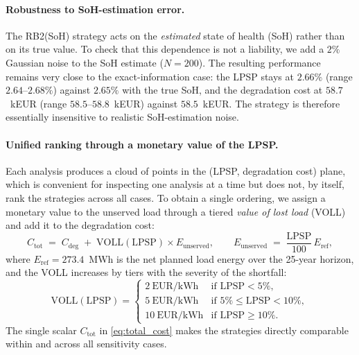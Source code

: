 \paragraph{Robustness to SoH-estimation error.}
The RB2(SoH) strategy acts on the \emph{estimated} state of health (SoH) rather
than on its true value. To check that this dependence is not a liability, we add
a $2\%$ Gaussian noise to the SoH estimate ($N=200$). The resulting performance
remains very close to the exact-information case: the LPSP stays at
$2.66\%$ (range $2.64$--$2.68\%$) against $2.65\%$ with the true SoH, and the
degradation cost at $58.7$~kEUR (range $58.5$--$58.8$~kEUR) against $58.5$~kEUR.
The strategy is therefore essentially insensitive to realistic SoH-estimation
noise.

\paragraph{Unified ranking through a monetary value of the LPSP.}
Each analysis produces a cloud of points in the (LPSP, degradation cost) plane,
which is convenient for inspecting one analysis at a time but does not, by
itself, rank the strategies across all cases. To obtain a single ordering, we
assign a monetary value to the unserved load through a tiered
\emph{value of lost load} (VOLL) and add it to the degradation cost:
\begin{equation}
  C_\mathrm{tot} \;=\; C_\mathrm{deg} \;+\;
  \mathrm{VOLL}(\mathrm{LPSP}) \times E_\mathrm{unserved},
  \qquad
  E_\mathrm{unserved} \;=\; \frac{\mathrm{LPSP}}{100}\,E_\mathrm{ref},
  \label{eq:total_cost}
\end{equation}
where $E_\mathrm{ref}=273.4$~MWh is the net planned load energy over the 25-year
horizon, and the VOLL increases by tiers with the severity of the shortfall:
\begin{equation}
  \mathrm{VOLL}(\mathrm{LPSP}) =
  \begin{cases}
    2~\mathrm{EUR/kWh}  & \text{if } \mathrm{LPSP} < 5\%, \\
    5~\mathrm{EUR/kWh}  & \text{if } 5\% \le \mathrm{LPSP} < 10\%, \\
    10~\mathrm{EUR/kWh} & \text{if } \mathrm{LPSP} \ge 10\%.
  \end{cases}
  \label{eq:voll}
\end{equation}
The single scalar $C_\mathrm{tot}$ in \eqref{eq:total_cost} makes the strategies
directly comparable within and across all sensitivity cases.


